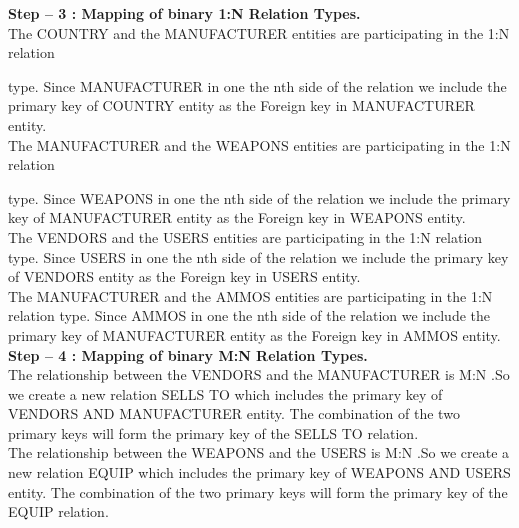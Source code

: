 \documentclass[12pt,a4paper]{report}
\begin{document}
\textbf{Step – 3 : Mapping of binary 1:N Relation Types.}\\
The COUNTRY and the MANUFACTURER entities are participating in the 1:N relation 

type. Since MANUFACTURER in one the nth side of the relation we include the primary key of COUNTRY entity as the Foreign key in MANUFACTURER entity.\\
The MANUFACTURER and the WEAPONS entities are participating in the 1:N relation 

type. Since WEAPONS in one the nth side of the relation we include the primary key of MANUFACTURER entity as the Foreign key in WEAPONS entity.\\
The VENDORS and the USERS entities are participating in the 1:N relation type. Since USERS in one the nth side of the relation we include the primary key of VENDORS entity as the Foreign key in USERS entity.\\
The MANUFACTURER and the AMMOS entities are participating in the 1:N relation type. Since AMMOS in one the nth side of the relation we include the primary key of MANUFACTURER entity as the Foreign key in AMMOS entity.\\

\textbf{Step – 4 : Mapping of binary M:N Relation Types.}\\
The relationship between the VENDORS and the MANUFACTURER is M:N .So we create a new relation SELLS TO which includes the primary key of VENDORS AND MANUFACTURER entity. The combination of the two primary keys will form the primary key of the SELLS TO relation.\\

The relationship between the WEAPONS and the USERS is M:N .So we create a new relation EQUIP which includes the primary key of WEAPONS AND USERS entity. The combination of the two primary keys will form the primary key of the EQUIP relation.\\
\end{document}
